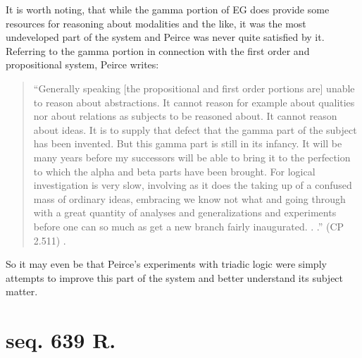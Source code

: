 It is worth noting, that while the gamma portion of EG does provide some resources for reasoning about modalities and the like, it was the most undeveloped part of the system and Peirce was never quite satisfied by it. Referring to the gamma portion in connection with the first order and propositional system, Peirce writes: \begin{quotation} \noindent``Generally speaking [the propositional and first order portions are] unable to reason about abstractions. It cannot reason for example about qualities nor about relations as subjects to be reasoned about. It cannot reason about ideas. It is to supply that defect that the gamma part of the subject has been invented. But this gamma part is still in its infancy. It will be many years before my successors will be able to bring it to the perfection to which the alpha and beta parts have been brought. For logical investigation is very slow, involving as it does the taking up of a confused mass of ordinary ideas, embracing we know not what and going through with a great quantity of analyses and generalizations and experiments before one can so much as get a new branch fairly inaugurated. . .'' (CP 2.511) .
\end{quotation}So it may even be that Peirce's experiments with triadic logic were simply attempts to improve this part of the system and better understand its subject matter.

\section{seq. 639 R.}

